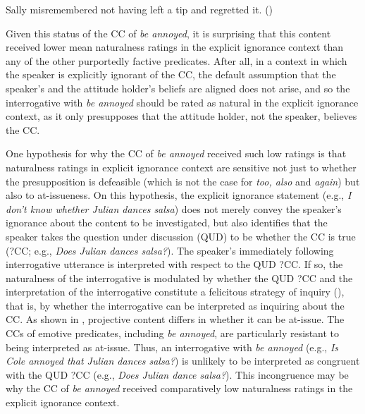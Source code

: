 \documentclass[11pt,fleqn]{article}
\newcommand{\6}{\mbox{$[\hspace*{-.6mm}[$}}
\newcommand{\9}{\mbox{$]\hspace*{-.6mm}]$}}
\begin{document}
\begin{exe}
\ex\label{emo} Sally misremembered not having left a tip and regretted it. \hfill (\citealt[712]{karttunen2016})
\end{exe}

Given this status of the CC of {\em be annoyed}, it is surprising that this content received lower mean naturalness ratings in the explicit ignorance context than any of the other purportedly factive predicates. After all, in a context in which the speaker is explicitly ignorant of the CC, the default assumption that the speaker's and the attitude holder's beliefs are aligned does not arise, and so the interrogative with {\em be annoyed} should be rated as natural in the explicit ignorance context, as it only presupposes that the attitude holder, not the speaker, believes the CC.

One hypothesis for why the CC of {\em be annoyed} received such low ratings is that naturalness ratings in explicit ignorance context are sensitive not just to whether the presupposition is defeasible (which is not the case for {\em too, also} and {\em again}) but also to at-issueness. On this hypothesis, the explicit ignorance statement (e.g., {\em I don't know whether Julian dances salsa}) does not merely convey the speaker's ignorance about the content to be investigated, but also identifies that the speaker takes the question under discussion (QUD) to be whether the CC is true (?CC; e.g., {\em Does Julian dances salsa?}). The speaker's immediately following interrogative utterance is interpreted with respect to the QUD ?CC. If so, the naturalness of the interrogative is modulated by whether the QUD ?CC  and the interpretation of the interrogative constitute a felicitous strategy of inquiry (\citealt[32f.]{roberts12}), that is,  by whether the interrogative can be interpreted as inquiring about the CC. As shown in \citealt{tbd-variability}, projective content differs in whether it can be at-issue. The CCs of emotive predicates, including {\em be annoyed}, are particularly resistant to being interpreted as at-issue. Thus, an interrogative with {\em be annoyed} (e.g., {\em Is Cole annoyed that Julian dances salsa?}) is unlikely to be interpreted as congruent with the QUD ?CC (e.g., {\em Does Julian dance salsa?}). This incongruence may be why the CC of {\em be annoyed} received comparatively low naturalness ratings in the explicit ignorance context.
\end{document}

